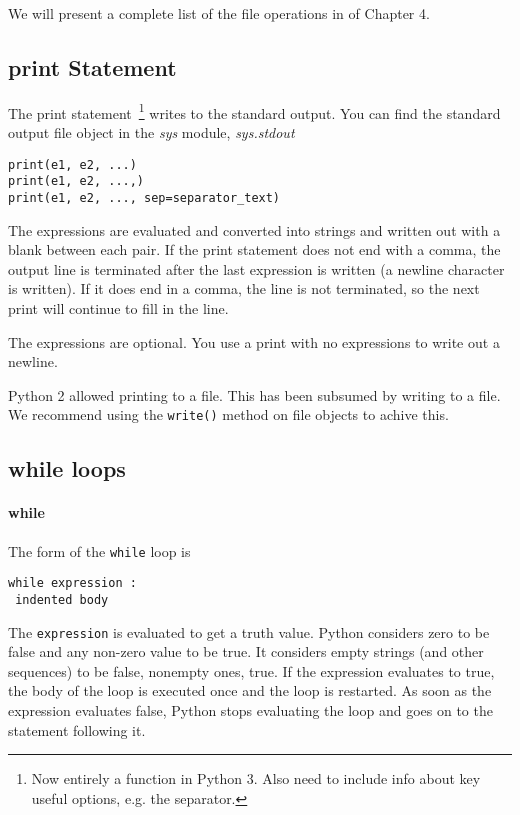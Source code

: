 We will present a complete list of
the file operations in \href{chap4.html\#22958}{} of Chapter 4.

\subsection{print Statement}
\label{print-statement}

The print statement~\footnote{Now entirely a function in Python 3. Also need to include info about key useful options, e.g. the separator.} writes
to the standard output. You can find the standard output file object in
the \emph{sys} module, \emph{sys.stdout}

\begin{verbatim}
print(e1, e2, ...)
print(e1, e2, ...,)
print(e1, e2, ..., sep=separator_text)
\end{verbatim}

The expressions are evaluated and
converted into strings and written out with a blank between each pair.
If the print statement does not end with a comma, the output line is
terminated after the last expression is written (a newline character is
written). If it does end in a comma, the line is not terminated, so the
next print will continue to fill in the line.

The expressions are optional. You
use a print with no expressions to write out a newline.

Python 2 allowed printing to a file. This has been subsumed by writing to a file. We recommend using the \texttt{write()} method on file objects to achive this.


\subsection{while loops}
\label{while-loops}

\paragraph{while}
\label{while-statement}

The form of the \texttt{while} loop is

\begin{verbatim}
while expression :
 indented body
\end{verbatim}

The \texttt{expression} is evaluated
to get a truth value. Python considers zero to be false and any non-zero
value to be true. It considers empty strings (and other sequences) to be
false, nonempty ones, true. If the expression evaluates to true, the
body of the loop is executed once and the loop is restarted. As soon as
the expression evaluates false, Python stops evaluating the loop and
goes on to the statement following it.

